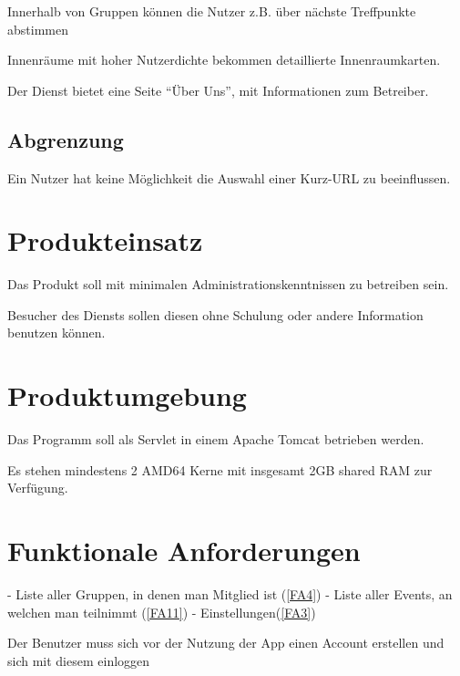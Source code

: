 \documentclass[parskip=full,11pt,twoside]{scrartcl}
\begin{document}
Innerhalb von Gruppen können die Nutzer z.B. über nächste Treffpunkte abstimmen

Innenräume mit hoher Nutzerdichte bekommen detaillierte Innenraumkarten.

Der Dienst bietet eine Seite \enquote{Über Uns},
mit Informationen zum Betreiber.

\subsection{Abgrenzung}

Ein Nutzer hat keine Möglichkeit die Auswahl einer Kurz-URL zu beeinflussen.

\pagebreak
\section{Produkteinsatz}

Das Produkt soll mit minimalen Administrationskenntnissen zu betreiben sein.

Besucher des Diensts sollen diesen ohne Schulung oder andere Information benutzen können.

\section{Produktumgebung}

Das Programm soll als Servlet in einem Apache Tomcat betrieben werden.

Es stehen mindestens 2 AMD64 Kerne mit insgesamt 2GB shared RAM zur Verfügung.

\section{Funktionale Anforderungen}

\label{FA1}
- Liste aller Gruppen, in denen man Mitglied ist (\ref{FA4})
- Liste aller Events, an welchen man teilnimmt (\ref{FA11})
- Einstellungen(\ref{FA3})

\label{FA2}
Der Benutzer muss sich vor der Nutzung der App einen Account erstellen und sich mit diesem einloggen
\end{document}
